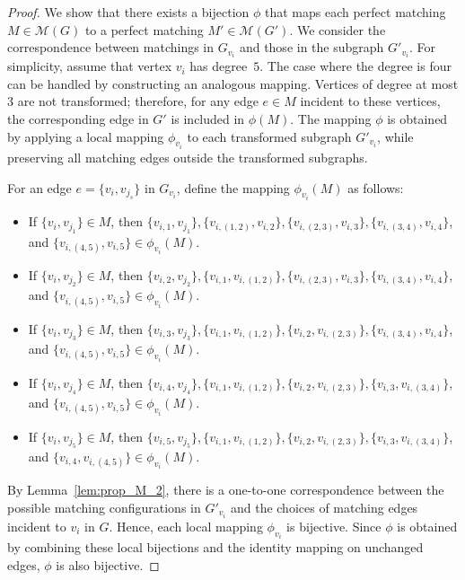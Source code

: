 \documentclass[a4paper,10pt]{article}
\begin{document}
\begin{proof}
    We show that there exists a bijection $\phi$ that maps each perfect matching $M \in \mathcal{M}(G)$ to a perfect matching $M' \in \mathcal{M}(G')$.
    We consider the correspondence between matchings in $G_{v_i}$ and those in the subgraph $G'_{v_i}$.
    For simplicity, assume that vertex $v_i$ has degree~$5$.
    The case where the degree is four can be handled by constructing an analogous mapping.
    Vertices of degree at most $3$ are not transformed; therefore, for any edge $e \in M$ incident to these vertices, the corresponding edge in $G'$ is included in $\phi(M)$.
    The mapping $\phi$ is obtained by applying a local mapping $\phi_{v_i}$ to each transformed subgraph $G'_{v_i}$, while preserving all matching edges outside the transformed subgraphs.

    For an edge $e=\{v_i, v_{j_s}\}$ in $G_{v_i}$, define the mapping $\phi_{v_i}(M)$ as follows:

    \begin{itemize}
        \item If $\{v_i, v_{j_1}\} \in M$, then $\{v_{i,1}, v_{j_1}\}, \{v_{i,(1,2)}, v_{i,2}\}, \{v_{i,(2,3)}, v_{i,3}\}, \{v_{i,(3,4)}, v_{i,4}\}$, and $ \{v_{i,(4,5)}, v_{i,5}\} \in \phi_{v_i}(M)$.
        
        \item If $\{v_i, v_{j_2}\} \in M$, then $\{v_{i,2}, v_{j_2}\}, \{v_{i,1}, v_{i,(1,2)}\}, \{v_{i,(2,3)}, v_{i,3}\}, \{v_{i,(3,4)}, v_{i,4}\}$, and $\{v_{i,(4,5)}, v_{i,5}\} \in \phi_{v_i}(M)$.
        
        \item If $\{v_i, v_{j_3}\} \in M$, then $\{v_{i,3}, v_{j_3}\}, \{v_{i,1}, v_{i,(1,2)}\}, \{v_{i,2}, v_{i,(2,3)}\}, \{v_{i,(3,4)}, v_{i,4}\}$, and $\{v_{i,(4,5)}, v_{i,5}\} \in \phi_{v_i}(M)$.
        
        \item If $\{v_i, v_{j_4}\} \in M$, then $\{v_{i,4}, v_{j_4}\}, \{v_{i,1}, v_{i,(1,2)}\}, \{v_{i,2}, v_{i,(2,3)}\}, \{v_{i,3}, v_{i,(3,4)}\}$, and $\{v_{i,(4,5)}, v_{i,5}\} \in \phi_{v_i}(M)$.
        
        \item If $\{v_i, v_{j_5}\} \in M$, then $\{v_{i,5}, v_{j_5}\}, \{v_{i,1}, v_{i,(1,2)}\}, \{v_{i,2}, v_{i,(2,3)}\}, \{v_{i,3}, v_{i,(3,4)}\}$, and $\{v_{i,4}, v_{i,(4,5)}\} \in \phi_{v_i}(M)$.
    \end{itemize}
    By Lemma~\ref{lem:prop_M_2}, there is a one-to-one correspondence between the possible matching configurations in $G'_{v_i}$ and the choices of matching edges incident to $v_i$ in $G$.
    Hence, each local mapping $\phi_{v_i}$ is bijective.
    Since $\phi$ is obtained by combining these local bijections and the identity mapping on unchanged edges, $\phi$ is also bijective.
\end{proof}
\end{document}
